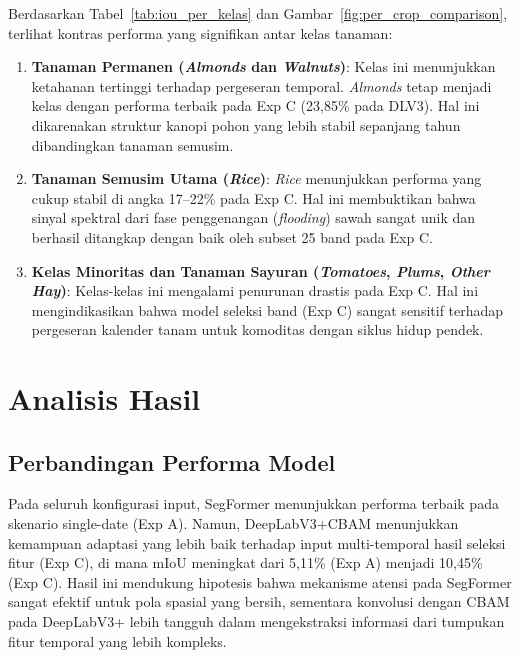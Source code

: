 Berdasarkan Tabel~\ref{tab:iou_per_kelas} dan Gambar~\ref{fig:per_crop_comparison}, terlihat 
kontras performa yang signifikan antar kelas tanaman:

\begin{enumerate}
    \item \textbf{Tanaman Permanen (\textit{Almonds} dan \textit{Walnuts})}: Kelas ini menunjukkan 
    ketahanan tertinggi terhadap pergeseran temporal. \textit{Almonds} tetap menjadi kelas 
    dengan performa terbaik pada Exp C (23,85\% pada DLV3). Hal ini dikarenakan struktur 
    kanopi pohon yang lebih stabil sepanjang tahun dibandingkan tanaman semusim.
    
    \item \textbf{Tanaman Semusim Utama (\textit{Rice})}: \textit{Rice} menunjukkan performa 
    yang cukup stabil di angka 17--22\% pada Exp C. Hal ini membuktikan bahwa 
    sinyal spektral dari fase penggenangan (\textit{flooding}) sawah sangat unik dan berhasil 
    ditangkap dengan baik oleh subset 25 band pada Exp C.
    
    \item \textbf{Kelas Minoritas dan Tanaman Sayuran (\textit{Tomatoes}, \textit{Plums}, \textit{Other Hay})}: 
    Kelas-kelas ini mengalami penurunan drastis pada Exp C. Hal ini mengindikasikan 
    bahwa model seleksi band (Exp C) sangat sensitif terhadap pergeseran kalender tanam 
    untuk komoditas dengan siklus hidup pendek.

\end{enumerate}

\section{Analisis Hasil}

\subsection{Perbandingan Performa Model}

Pada seluruh konfigurasi input, SegFormer menunjukkan performa terbaik pada skenario single-date (Exp A). 
Namun, DeepLabV3+CBAM menunjukkan kemampuan adaptasi yang lebih baik terhadap input multi-temporal 
hasil seleksi fitur (Exp C), di mana mIoU meningkat dari 5,11\% (Exp A) menjadi 10,45\% (Exp C). 
Hasil ini mendukung hipotesis bahwa mekanisme atensi pada SegFormer sangat efektif untuk pola spasial 
yang bersih, sementara konvolusi dengan CBAM pada DeepLabV3+ lebih tangguh dalam mengekstraksi informasi 
dari tumpukan fitur temporal yang lebih kompleks.

